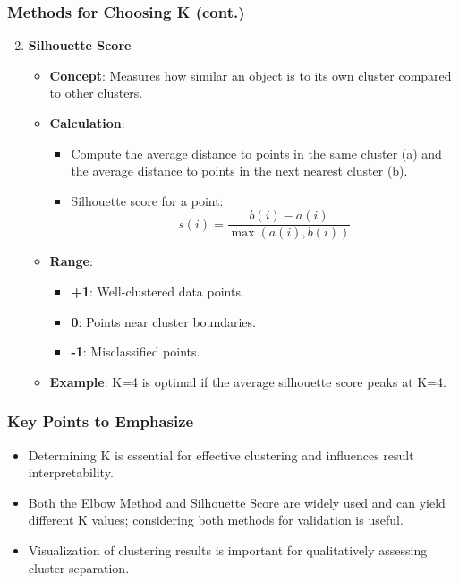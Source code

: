 \documentclass[aspectratio=169]{beamer}
\begin{document}
\begin{frame}[fragile]
    \frametitle{Methods for Choosing K (cont.)}
    \begin{enumerate}
        \setcounter{enumi}{1}
        \item \textbf{Silhouette Score}
        \begin{itemize}
            \item \textbf{Concept}: Measures how similar an object is to its own cluster compared to other clusters.
            \item \textbf{Calculation}:
                \begin{itemize}
                    \item Compute the average distance to points in the same cluster (a) and the average distance to points in the next nearest cluster (b).
                    \item Silhouette score for a point: 
                    \begin{equation}
                        s(i) = \frac{b(i) - a(i)}{\max(a(i), b(i))}
                    \end{equation}
                \end{itemize}
            \item \textbf{Range}: 
                \begin{itemize}
                    \item \textbf{+1}: Well-clustered data points.
                    \item \textbf{0}: Points near cluster boundaries.
                    \item \textbf{-1}: Misclassified points.
                \end{itemize}
            \item \textbf{Example}: K=4 is optimal if the average silhouette score peaks at K=4.
        \end{itemize}
    \end{enumerate}
\end{frame}

\begin{frame}[fragile]
    \frametitle{Key Points to Emphasize}
    \begin{itemize}
        \item Determining K is essential for effective clustering and influences result interpretability.
        \item Both the Elbow Method and Silhouette Score are widely used and can yield different K values; considering both methods for validation is useful.
        \item Visualization of clustering results is important for qualitatively assessing cluster separation.
    \end{itemize}
\end{frame}
\end{document}
